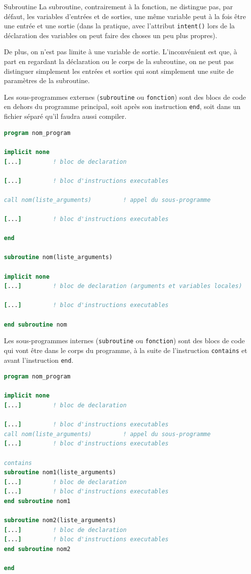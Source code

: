 \documentclass[a4paper,twoside]{article}
\begin{document}
\begin{definition}{Subroutine}
La subroutine, contrairement à la fonction, ne distingue pas, par défaut, les variables d'entrées et de sorties, une même variable peut à la fois être une entrée et une sortie (dans la pratique, avec l'attribut \texttt{intent()} lors de la déclaration des variables on peut faire des choses un peu plus propres). 

De plus, on n'est pas limite à une variable de sortie. L'inconvénient est que, à part en regardant la déclaration ou le corps de la subroutine, on ne peut pas distinguer simplement les entrées et sorties qui sont simplement une suite de paramètres de la subroutine.
\end{definition}


\bigskip

Les sous-programmes externes (\texttt{subroutine} ou \texttt{fonction}) sont des blocs de code en dehors du programme principal, soit après son instruction \texttt{end}, soit dans un fichier séparé qu'il faudra aussi compiler. 
\begin{lstlisting}[language=Fortran]
program nom_program
 
implicit none 
[...]         ! bloc de declaration
 
[...]         ! bloc d'instructions executables
 
call nom(liste_arguments)         ! appel du sous-programme
 
[...]         ! bloc d'instructions executables
 
end  

subroutine nom(liste_arguments)

implicit none 
[...]         ! bloc de declaration (arguments et variables locales)

[...]         ! bloc d'instructions executables
 
end subroutine nom 
\end{lstlisting}


Les sous-programmes internes (\texttt{subroutine} ou \texttt{fonction}) sont des blocs de code qui vont être dans le corps du programme, à la suite de l'instruction \texttt{contains} et avant l'instruction \texttt{end}.
\begin{lstlisting}[language=Fortran]
program nom_program
 
implicit none 
[...]         ! bloc de declaration
 
[...]         ! bloc d'instructions executables 
call nom(liste_arguments)         ! appel du sous-programme 
[...]         ! bloc d'instructions executables 

contains 
subroutine nom1(liste_arguments) 
[...]         ! bloc de declaration 
[...]         ! bloc d'instructions executables 
end subroutine nom1 

subroutine nom2(liste_arguments) 
[...]         ! bloc de declaration 
[...]         ! bloc d'instructions executables 
end subroutine nom2 

end
\end{lstlisting}
\end{document}
